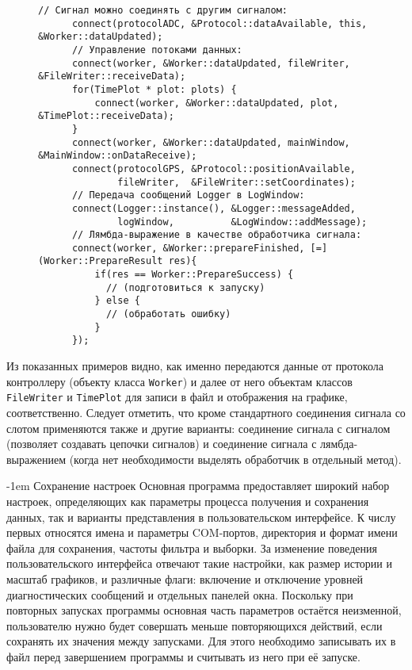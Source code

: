 \documentclass[a4paper, 14pt, titlepage]{extarticle}
\makeatletter
\newcommand{\inlinecode}[1]{\lstinline[basicstyle=\ttfamily]{#1}}
\newenvironment{myfigure}[2]%
    {\pushQED{\caption{#1} \label{#2}} %
     \begin{figure}[!htb]\centering } %
    {  \popQED %
     \end{figure}}
\renewcommand{\paragraph}{%
    \@startsection{paragraph}{4}%
    {\parindent}{\z@}{-1em}%
    {\normalfont\normalsize\bfseries}%
  }
\makeatother
\begin{document}
  \begin{myfigure}{Примеры соединения сигналов и слотов}{fig:src-signals-slots}
    \begin{lstlisting}[xleftmargin=0pt, xrightmargin=0pt, basicstyle=\footnotesize]
      // Сигнал можно соединять с другим сигналом:
      connect(protocolADC, &Protocol::dataAvailable, this, &Worker::dataUpdated);
      // Управление потоками данных:
      connect(worker, &Worker::dataUpdated, fileWriter, &FileWriter::receiveData);
      for(TimePlot * plot: plots) {
          connect(worker, &Worker::dataUpdated, plot, &TimePlot::receiveData);
      }
      connect(worker, &Worker::dataUpdated, mainWindow, &MainWindow::onDataReceive);
      connect(protocolGPS, &Protocol::positionAvailable,
              fileWriter,  &FileWriter::setCoordinates);
      // Передача сообщений Logger в LogWindow:
      connect(Logger::instance(), &Logger::messageAdded,
              logWindow,          &LogWindow::addMessage);
      // Лямбда-выражение в качестве обработчика сигнала:
      connect(worker, &Worker::prepareFinished, [=](Worker::PrepareResult res){
          if(res == Worker::PrepareSuccess) {
            // (подготовиться к запуску)
          } else {
            // (обработать ошибку)
          }
      });
    \end{lstlisting}
  \end{myfigure}

  Из показанных примеров видно, как именно передаются данные от протокола контроллеру (объекту
  класса \inlinecode{Worker}) и далее от него объектам классов \inlinecode{FileWriter} и
  \inlinecode{TimePlot} для записи в файл и отображения на графике, соответственно.
  Следует отметить, что кроме стандартного соединения сигнала со слотом применяются также и другие
  варианты: соединение сигнала с сигналом (позволяет создавать цепочки сигналов) и соединение
  сигнала с лямбда-выражением (когда нет необходимости выделять обработчик в отдельный метод).

  \paragraph{Сохранение настроек}
  Основная программа предоставляет широкий набор настроек, определяющих как параметры процесса
  получения и сохранения данных, так и варианты представления в пользовательском интерфейсе. К числу
  первых относятся имена и параметры COM-портов, директория и формат имени файла для сохранения,
  частоты фильтра и выборки. За изменение поведения пользовательского интерфейса отвечают такие
  настройки, как размер истории и масштаб графиков, и различные флаги: включение и отключение
  уровней диагностических сообщений и отдельных панелей окна. Поскольку при повторных запусках
  программы основная часть параметров остаётся неизменной, пользователю нужно будет совершать меньше
  повторяющихся действий, если сохранять их значения между запусками. Для этого необходимо
  записывать их в файл перед завершением программы и считывать из него при её запуске.
\end{document}
